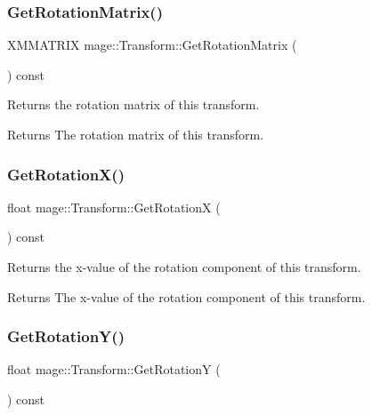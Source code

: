\subsubsection{\texorpdfstring{Get\+Rotation\+Matrix()}{GetRotationMatrix()}}
{\footnotesize\ttfamily X\+M\+M\+A\+T\+R\+IX mage\+::\+Transform\+::\+Get\+Rotation\+Matrix (\begin{DoxyParamCaption}{ }\end{DoxyParamCaption}) const}

Returns the rotation matrix of this transform.

\begin{DoxyReturn}{Returns}
The rotation matrix of this transform. 
\end{DoxyReturn}
\hypertarget{structmage_1_1_transform_aaaf300a4a24b976c271ba17c8a41beaf}{}\label{structmage_1_1_transform_aaaf300a4a24b976c271ba17c8a41beaf} 
\subsubsection{\texorpdfstring{Get\+Rotation\+X()}{GetRotationX()}}
{\footnotesize\ttfamily float mage\+::\+Transform\+::\+Get\+RotationX (\begin{DoxyParamCaption}{ }\end{DoxyParamCaption}) const}

Returns the x-\/value of the rotation component of this transform.

\begin{DoxyReturn}{Returns}
The x-\/value of the rotation component of this transform. 
\end{DoxyReturn}
\hypertarget{structmage_1_1_transform_a93ccd53bd0a4e71ab7f42447d482ab86}{}\label{structmage_1_1_transform_a93ccd53bd0a4e71ab7f42447d482ab86} 
\subsubsection{\texorpdfstring{Get\+Rotation\+Y()}{GetRotationY()}}
{\footnotesize\ttfamily float mage\+::\+Transform\+::\+Get\+RotationY (\begin{DoxyParamCaption}{ }\end{DoxyParamCaption}) const}


